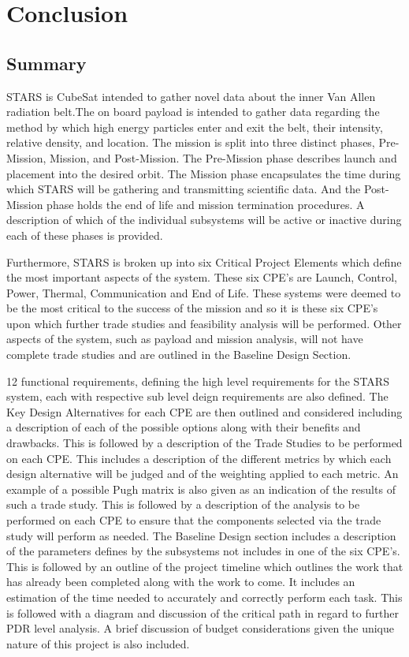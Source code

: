 
\section{Conclusion}
\subsection{Summary}

STARS is CubeSat intended to gather novel data about the inner Van Allen radiation belt.The on board payload is intended to gather data regarding the method by which high energy particles enter and exit the belt, their intensity, relative density, and location. The mission is split into three distinct phases, Pre-Mission, Mission, and Post-Mission. The Pre-Mission phase describes launch and placement into the desired orbit. The Mission phase encapsulates the time during which STARS will be gathering and transmitting scientific data. And the Post-Mission phase holds the end of life and mission termination procedures. A description of which of the individual subsystems will be active or inactive during each of these phases is provided.

Furthermore, STARS is broken up into six Critical Project Elements which define the most important aspects of the system. These six CPE's are Launch, Control, Power, Thermal, Communication and End of Life. These systems were deemed to be the most critical to the success of the mission and so it is these six CPE's upon which further trade studies and feasibility analysis will be performed.  Other aspects of the system, such as payload and mission analysis, will not have complete trade studies and are outlined in the Baseline Design Section.

12 functional requirements, defining the high level requirements for the STARS system, each with respective sub level deign requirements are also defined. The Key Design Alternatives for each CPE are then outlined and considered including a description of each of the possible options along with their benefits and drawbacks. This is followed by a description of the Trade Studies to be performed on each CPE. This includes a description of the different metrics by which each design alternative will be judged and of the weighting applied to each metric. An example of a possible Pugh matrix is also given as an indication of the results of such a trade study. This is followed by a description of the analysis to be performed on each CPE to ensure that the components selected via the trade study will perform as needed. The Baseline Design section includes a description of the parameters defines by the subsystems not includes in one of the six CPE's. This is followed by an outline of the project timeline which outlines the work that has already been completed along with the work to come. It includes an estimation of the time needed to accurately and correctly perform each task. This is followed with a diagram and discussion of the critical path in regard to further PDR level analysis. A brief discussion of budget considerations given the unique nature of this project is also included. 
